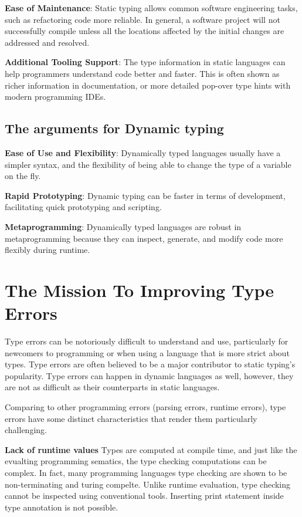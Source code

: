 \textbf{Ease of Maintenance}: Static typing allows common software engineering tasks, such as refactoring code more reliable. In general, a software project will not successfully compile unless all the  locations affected by the initial changes are addressed and resolved.

\textbf{Additional Tooling Support}: The type information in static languages can help programmers understand code better and faster. This is often shown as richer information in documentation, or more detailed pop-over type hints with modern programming IDEs.  

\subsection{The arguments for Dynamic typing}

\textbf{Ease of Use and Flexibility}: Dynamically typed languages usually have a simpler syntax, and the flexibility of being able to change the type of a variable on the fly.

\textbf{Rapid Prototyping}: Dynamic typing can be faster in terms of development, facilitating quick prototyping and scripting.

\textbf{Metaprogramming}: Dynamically typed languages are robust in metaprogramming because they can inspect, generate, and modify code more flexibly during runtime.


\section{The Mission To Improving Type Errors}

Type errors can be notoriously difficult to understand and use, particularly for newcomers to programming or when using a language that is more strict about types. Type errors are often believed to be a major contributor to static typing's popularity. Type errors can happen in dynamic languages as well, however, they are not as difficult as their counterparts in static languages.

Comparing to other programming errors (parsing errors, runtime errors), type errors have some distinct characteristics that render them particularly challenging. 

\textbf{Lack of runtime values}
Types are computed at compile time, and just like the evualting programming sematics, the type checking computations can be complex. In fact, many programming languages type checking are shown to be non-terminating and turing compelte.  Unlike runtime evaluation, type checking cannot be inspected using conventional tools. Inserting print statement inside type annotation is not possible. 

